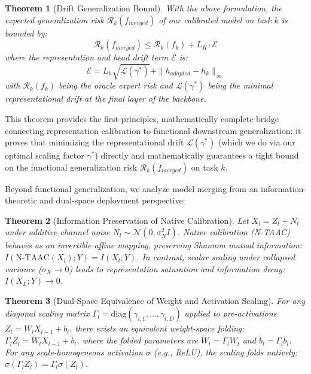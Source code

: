 \documentclass{article}
\theoremstyle{plain}
\newtheorem{theorem}{Theorem}[section]
\theoremstyle{definition}
\theoremstyle{remark}
\begin{document}
\begin{theorem}[Drift Generalization Bound]\label{thm:generalization_drift}
With the above formulation, the expected generalization risk $\mathcal{R}_k(f_{merged})$ of our calibrated model on task $k$ is bounded by:
$$\mathcal{R}_k(f_{merged}) \le \mathcal{R}_k(f_k) + L_R \cdot \mathcal{E}$$
where the representation and head drift term $\mathcal{E}$ is:
$$\mathcal{E} = L_h \sqrt{\mathcal{L}(\gamma^*)} + \| h_{adapted} - h_k \|_\infty$$
with $\mathcal{R}_k(f_k)$ being the oracle expert risk and $\mathcal{L}(\gamma^*)$ being the minimal representational drift at the final layer of the backbone.
\end{theorem}

This theorem provides the first-principles, mathematically complete bridge connecting representation calibration to functional downstream generalization: it proves that minimizing the representational drift $\mathcal{L}(\gamma^*)$ (which we do via our optimal scaling factor $\gamma^*$) directly and mathematically guarantees a tight bound on the functional generalization risk $\mathcal{R}_k(f_{merged})$ on task $k$.

Beyond functional generalization, we analyze model merging from an information-theoretic and dual-space deployment perspective:

\begin{theorem}[Information Preservation of Native Calibration]\label{thm:information_preservation}
Let $X_l = Z_l + N_l$ under additive channel noise $N_l \sim \mathcal{N}(0, \sigma_N^2 I)$. Native calibration (N-TAAC) behaves as an invertible affine mapping, preserving Shannon mutual information: $I(\text{N-TAAC}(X_l); Y) = I(X_l; Y)$. In contrast, scalar scaling under collapsed variance ($\sigma_X \to 0$) leads to representation saturation and information decay: $I(X_L; Y) \to 0$.
\end{theorem}

\begin{theorem}[Dual-Space Equivalence of Weight and Activation Scaling]\label{thm:dual_equivalence}
For any diagonal scaling matrix $\Gamma_l = \text{diag}(\gamma_{l,1}, \dots, \gamma_{l,D})$ applied to pre-activations $Z_l = W_l X_{l-1} + b_l$, there exists an equivalent weight-space folding: $\Gamma_l Z_l = \widetilde{W}_l X_{l-1} + \widetilde{b}_l$, where the folded parameters are $\widetilde{W}_l = \Gamma_l W_l$ and $\widetilde{b}_l = \Gamma_l b_l$. For any scale-homogeneous activation $\sigma$ (e.g., ReLU), the scaling folds natively: $\sigma(\Gamma_l Z_l) = \Gamma_l \sigma(Z_l)$.
\end{theorem}
\end{document}
